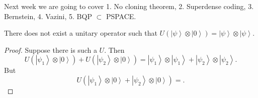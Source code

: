 
Next week we are going to cover
1. No cloning theorem, 2. Superdense coding, 3. Bernstein, 4. Vazini, 5. BQP $\subset $ PSPACE.

\begin{theorem}[No Cloning]
	\label{thm:NoCloning}
	There does not exist a unitary operator such that $U\left( \left| \psi \right\rangle \otimes \left| 0 \right\rangle  \right)  = \left| \psi \right\rangle  \otimes  \left| \psi \right\rangle $.
\end{theorem}
\begin{proof}
	Suppose there is such a $U$. Then 
	\[
		U\left( \left| \psi_1 \right\rangle  \otimes \left| 0 \right\rangle  \right) + U(\left| \psi_2 \right\rangle \otimes \left| 0 \right\rangle ) = \left| \psi_1 \right\rangle \otimes \left| \psi_1 \right\rangle + \left| \psi_2 \right\rangle \otimes \left| \psi_2 \right\rangle  
	.\] 
	But
	\[
		U(\left| \psi_1 \right\rangle \otimes \left| 0 \right\rangle  + \left| \psi_2 \right\rangle \otimes \left| 0 \right\rangle ) = 
	.\] 
\end{proof}

